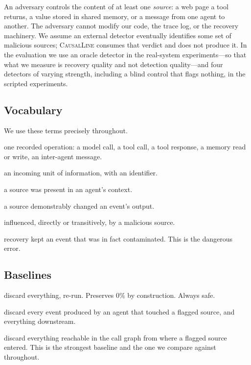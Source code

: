 \documentclass[10pt,twocolumn]{article}
\newcommand{\sys}{\textsc{CausalLine}}
\newcommand{\bzero}{\textsf{B0}}
\newcommand{\bone}{\textsf{B1}}
\newcommand{\btwo}{\textsf{B2}}
\begin{document}
An adversary controls the content of at least one \emph{source}: a web page a
tool returns, a value stored in shared memory, or a message from one agent to
another. The adversary cannot modify our code, the trace log, or the recovery
machinery. We assume an external detector eventually identifies some set of
malicious sources; \sys{} consumes that verdict and does not produce it. In
the evaluation we use an oracle detector in the real-system experiments---so
that what we measure is recovery quality and not detection quality---and four
detectors of varying strength, including a blind control that flags nothing,
in the scripted experiments.

\subsection{Vocabulary}

We use these terms precisely throughout.

\begin{description}
\itemsep1pt
\item[event] one recorded operation: a model call, a tool call, a tool
response, a memory read or write, an inter-agent message.
\item[source] an incoming unit of information, with an identifier.
\item[exposure] a source was present in an agent's context.
\item[influence] a source demonstrably changed an event's output.
\item[contaminated] influenced, directly or transitively, by a malicious
source.
\item[unsafe preservation] recovery kept an event that was in fact
contaminated. This is the dangerous error.
\end{description}

\subsection{Baselines}

\begin{description}
\itemsep1pt
\item[\bzero{} full restart] discard everything, re-run. Preserves $0\%$ by
construction. Always safe.
\item[\bone{} agent-level taint] discard every event produced by an agent that
touched a flagged source, and everything downstream.
\item[\btwo{} topology closure] discard everything reachable in the call graph
from where a flagged source entered. This is the strongest baseline and the
one we compare against throughout.
\end{description}
\end{document}
